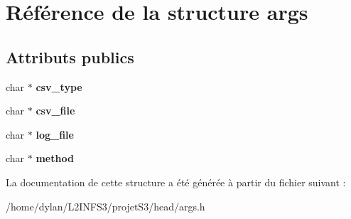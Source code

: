 \hypertarget{structargs}{}\section{Référence de la structure args}
\label{structargs}
\subsection*{Attributs publics}
\begin{DoxyCompactItemize}
\item 
\mbox{\label{structargs_a3006ae91d26ea832ec8d3e2de72d2513}} 
char $\ast$ {\bfseries csv\+\_\+type}
\item 
\mbox{\label{structargs_adba2ccba506a341a21ac6b5b463fbc77}} 
char $\ast$ {\bfseries csv\+\_\+file}
\item 
\mbox{\label{structargs_a838003210ad279381f565cdb3d625b81}} 
char $\ast$ {\bfseries log\+\_\+file}
\item 
\mbox{\label{structargs_a9b784147c63d34273e01d8032bf8e8c1}} 
char $\ast$ {\bfseries method}
\end{DoxyCompactItemize}


La documentation de cette structure a été générée à partir du fichier suivant \+:\begin{DoxyCompactItemize}
\item 
/home/dylan/\+L2\+I\+N\+F\+S3/projet\+S3/head/args.\+h\end{DoxyCompactItemize}
